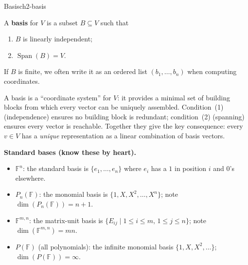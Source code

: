 \begin{definition}{Basis}{ch2-basis}

A \textbf{basis} for $V$ is a subset $B\subseteq V$ such that

\begin{enumerate}

\item $B$ is linearly independent;

\item $\operatorname{Span}(B)=V$.

\end{enumerate}

If $B$ is finite, we often write it as an ordered list $(b_1,\ldots,b_n)$ when computing coordinates.

\end{definition}

A basis is a ``coordinate system'' for $V$: it provides a minimal set of building blocks from which every vector can be uniquely assembled.
Condition~(1) (independence) ensures no building block is redundant; condition~(2) (spanning) ensures every vector is reachable.
Together they give the key consequence: every $v\in V$ has a \emph{unique} representation as a linear combination of basis vectors.

\begin{keyformula}
\textbf{Standard bases (know these by heart).}
\begin{itemize}[leftmargin=*]
\item $\mathbb{F}^n$: the standard basis is $\{e_1,\ldots,e_n\}$ where $e_i$ has a $1$ in position $i$ and $0$'s elsewhere.
\item $P_n(\mathbb{F})$: the monomial basis is $\{1,X,X^2,\ldots,X^n\}$; note $\dim(P_n(\mathbb{F}))=n+1$.
\item $\mathbb{F}^{m,n}$: the matrix-unit basis is $\{E_{ij}\mid 1\le i\le m,\,1\le j\le n\}$; note $\dim(\mathbb{F}^{m,n})=mn$.
\item $P(\mathbb{F})$ (all polynomials): the infinite monomial basis $\{1,X,X^2,\ldots\}$; $\dim(P(\mathbb{F}))=\infty$.
\end{itemize}
\end{keyformula}

